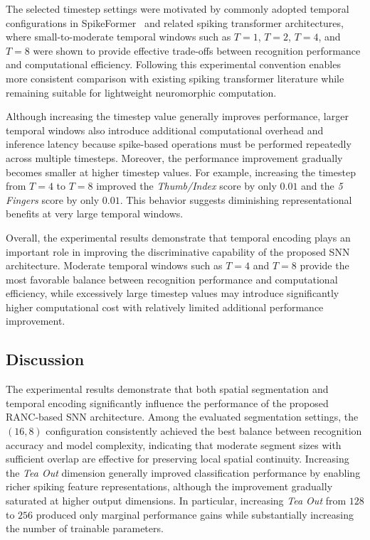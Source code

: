 \documentclass[../main.tex]{subfiles}
\begin{document}
The selected timestep settings were motivated by commonly adopted temporal configurations in SpikeFormer~\cite{zhou2023spikeformer} and related spiking transformer architectures, where small-to-moderate temporal windows such as \(T=1\), \(T=2\), \(T=4\), and \(T=8\) were shown to provide effective trade-offs between recognition performance and computational efficiency. Following this experimental convention enables more consistent comparison with existing spiking transformer literature while remaining suitable for lightweight neuromorphic computation.

Although increasing the timestep value generally improves performance, larger temporal windows also introduce additional computational overhead and inference latency because spike-based operations must be performed repeatedly across multiple timesteps. Moreover, the performance improvement gradually becomes smaller at higher timestep values. For example, increasing the timestep from \(T=4\) to \(T=8\) improved the \textit{Thumb/Index} score by only \(0.01\) and the \textit{5 Fingers} score by only \(0.01\). This behavior suggests diminishing representational benefits at very large temporal windows.

Overall, the experimental results demonstrate that temporal encoding plays an important role in improving the discriminative capability of the proposed SNN architecture. Moderate temporal windows such as \(T=4\) and \(T=8\) provide the most favorable balance between recognition performance and computational efficiency, while excessively large timestep values may introduce significantly higher computational cost with relatively limited additional performance improvement.

\subsection{Discussion}

The experimental results demonstrate that both spatial segmentation and temporal encoding significantly influence the performance of the proposed RANC-based SNN architecture. Among the evaluated segmentation settings, the \((16,8)\) configuration consistently achieved the best balance between recognition accuracy and model complexity, indicating that moderate segment sizes with sufficient overlap are effective for preserving local spatial continuity. Increasing the \textit{Tea Out} dimension generally improved classification performance by enabling richer spiking feature representations, although the improvement gradually saturated at higher output dimensions. In particular, increasing \textit{Tea Out} from \(128\) to \(256\) produced only marginal performance gains while substantially increasing the number of trainable parameters. 
\end{document}

